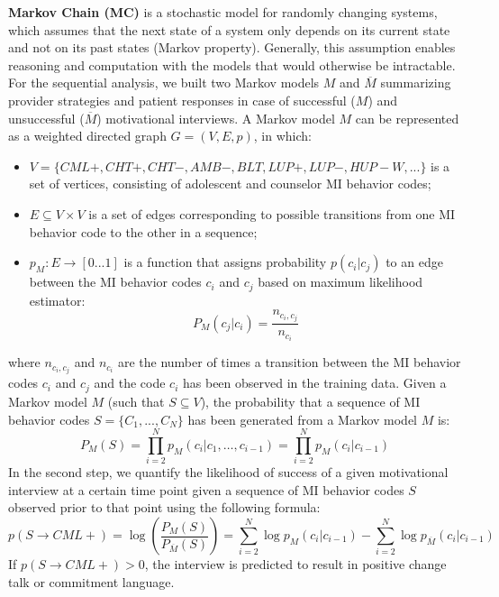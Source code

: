 \documentclass{amia_summit_2018}
\begin{document}
\textbf {Markov Chain (MC)} is a stochastic model for randomly changing systems, which assumes that the next state of a system only depends on its current state and not on its past states (Markov property). Generally, this assumption enables reasoning and computation with the models that would otherwise be intractable. For the sequential analysis, we built two Markov models $M$ and $\overline{M}$ summarizing provider strategies and patient responses in case of successful ($M$) and unsuccessful ($\overline{M}$) motivational interviews. A Markov model $M$ can be represented as a weighted directed graph $G = (V, E, p)$, in which:
\begin{itemize}
\item $V = \{CML+, CHT+, CHT-, AMB-, BLT, LUP+, LUP-, HUP-W, ...\}$ is a set of vertices, consisting of adolescent and counselor MI behavior codes;
\item $E \subseteq V \times V$ is a set of edges corresponding to possible transitions from one MI behavior code to the other in a sequence;
\item $p_M:E\rightarrow[0...1]$ is a function that assigns probability $p(c_i|c_j)$ to an edge between the MI behavior codes $c_i$ and $c_j$ based on maximum likelihood estimator:
\begin{equation}
P_M(c_j|c_i) = \frac{n_{c_i,c_j}}{n_{c_i}}
\end{equation}
\end{itemize}
where $n_{c_i,c_j}$ and $n_{c_i}$ are the number of times a transition between the MI behavior codes $c_i$ and $c_j$ and the code $c_i$ has been observed in the training data. Given a Markov model $M$ (such that $S\subseteq V$), the probability that a sequence of MI behavior codes $S = \{C_1,...,C_N\}$ has been generated from a Markov model $M$ is:
\begin{equation}
P_M(S) = \prod_{i=2}^N p_M(c_i|c_1,\dots,c_{i-1})=\prod_{i=2}^N p_M(c_i|c_{i-1})
\end{equation}
In the second step, we quantify the likelihood of success of a given motivational interview at a certain time point given a sequence of MI behavior codes $S$ observed prior to that point using the following formula:
\begin{equation}
p(S\rightarrow CML+) = \log\left(\frac{P_M(S)}{P_{\overline M}(S)}\right)= \sum_{i=2}^N \log p_M(c_i|c_{i-1})-\sum_{i=2}^N \log p_{\overline M}(c_i|c_{i-1})\label{eq:class}
\end{equation}
If $p(S\rightarrow CML+) > 0 $, the interview is predicted to result in positive change talk or commitment language. 
\end{document}
